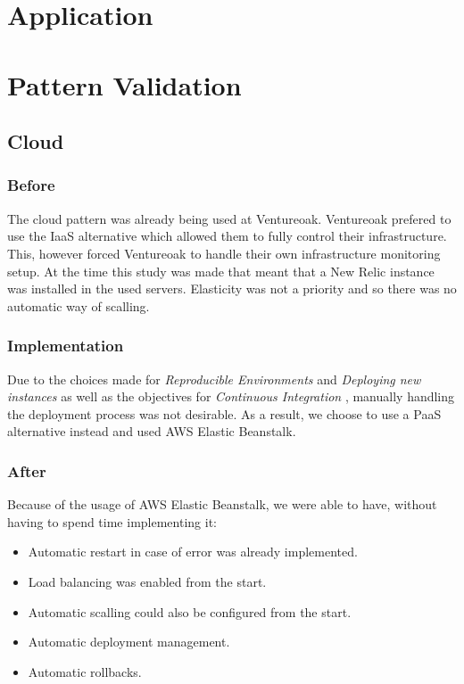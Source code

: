 	\section{Application}


	\section{Pattern Validation}
		\subsection{Cloud}
			\subsubsection*{Before}
			The cloud pattern was already being used at Ventureoak. Ventureoak prefered to use the IaaS alternative which allowed them to fully control their infrastructure. This, however forced Ventureoak to handle their own infrastructure monitoring setup. At the time this study was made that meant that a New Relic instance was installed in the used servers. Elasticity was not a priority and so there was no automatic way of scalling.
			\subsubsection*{Implementation}
			Due to the choices made for \textit{Reproducible Environments} and \textit{Deploying new instances} as well as the objectives for \textit{Continuous Integration} , manually handling the deployment process was not desirable. As a result, we choose to use a PaaS alternative instead and used AWS Elastic Beanstalk.
			\subsubsection*{After}
			Because of the usage of AWS Elastic Beanstalk, we were able to have, without having to spend time implementing it:
			\begin{itemize}
					\item Automatic restart in case of error was already implemented.
					\item Load balancing was enabled from the start.
					\item Automatic scalling could also be configured from the start.
					\item Automatic deployment management.
					\item Automatic rollbacks.
			\end{itemize}
